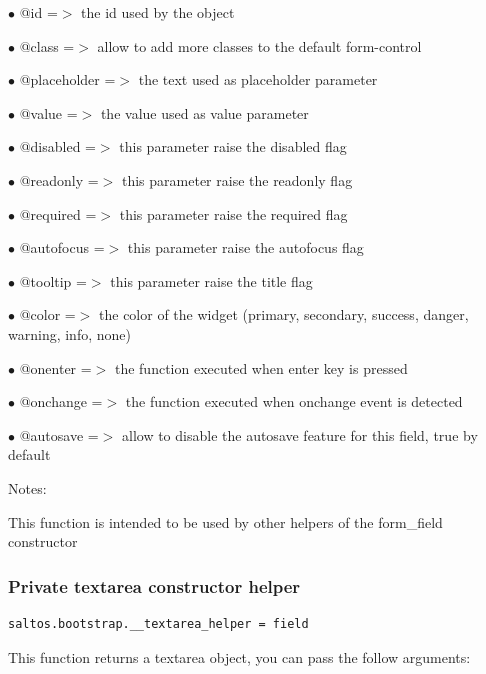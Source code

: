 \documentclass[a4paper]{article}
\begin{document}
\begin{compactitem}
\item[\color{myblue}$\bullet$] @id          =$>$ the id used by the object
\item[\color{myblue}$\bullet$] @class       =$>$ allow to add more classes to the default form-control
\item[\color{myblue}$\bullet$] @placeholder =$>$ the text used as placeholder parameter
\item[\color{myblue}$\bullet$] @value       =$>$ the value used as value parameter
\item[\color{myblue}$\bullet$] @disabled    =$>$ this parameter raise the disabled flag
\item[\color{myblue}$\bullet$] @readonly    =$>$ this parameter raise the readonly flag
\item[\color{myblue}$\bullet$] @required    =$>$ this parameter raise the required flag
\item[\color{myblue}$\bullet$] @autofocus   =$>$ this parameter raise the autofocus flag
\item[\color{myblue}$\bullet$] @tooltip     =$>$ this parameter raise the title flag
\item[\color{myblue}$\bullet$] @color       =$>$ the color of the widget (primary, secondary, success, danger, warning, info, none)
\item[\color{myblue}$\bullet$] @onenter     =$>$ the function executed when enter key is pressed
\item[\color{myblue}$\bullet$] @onchange    =$>$ the function executed when onchange event is detected
\item[\color{myblue}$\bullet$] @autosave    =$>$ allow to disable the autosave feature for this field, true by default
\end{compactitem}

Notes:

This function is intended to be used by other helpers of the form\_field constructor

\hypertarget{toc94}{}
\subsubsection{Private textarea constructor helper}

\begin{lstlisting}
saltos.bootstrap.__textarea_helper = field
\end{lstlisting}

This function returns a textarea object, you can pass the follow arguments:
\end{document}
